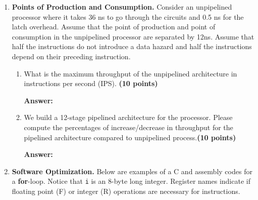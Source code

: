 \documentclass[a4paper, 11pt]{exam}
\begin{document}
\begin{center}
\begin{enumerate}
\pagebreak

\item \textbf{Points of Production and Consumption.}
Consider an unpipelined processor where it takes 36 ns to go through the circuits and 0.5 ns for the latch overhead. Assume that the point of production and point of consumption in the unpipelined processor are separated by 12ns. Assume that half the instructions do not introduce a data hazard and half the instructions depend on their preceding instruction.

\begin{enumerate}
\item What is the maximum throughput of the unpipelined architecture in instructions per second (IPS). \textbf{(10 points)} \\

\hfill
 
\textbf{Answer:} 

\hfill

\item We build a 12-stage pipelined architecture for the processor. Please compute the percentages of increase/decrease in throughput for the pipelined architecture compared to unpipelined process.\textbf {(10 points)}

\hfill
 
\textbf{Answer:} 

\hfill

\end{enumerate}


\item \textbf {Software Optimization.}
Below are examples of a C and assembly codes for a \textbf{for}-loop.
Notice that \texttt{i} is an 8-byte long integer. Register names indicate if floating point (F) or integer (R) operations are necessary for instructions.


\end{enumerate}
\end{center}
\end{document}
